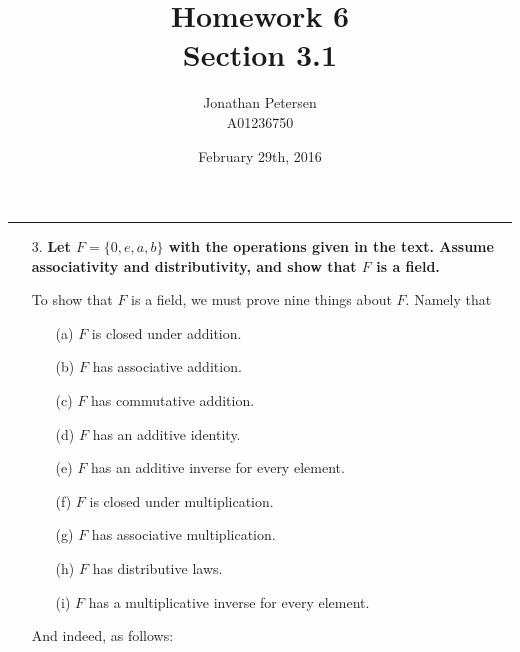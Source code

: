 \documentclass{article}
\title{Homework 6 \\ Section 3.1}
\author{Jonathan Petersen \\ A01236750}
\date{February 29th, 2016}
\begin{document}
	\maketitle
	\hrule 
	\vspace{5mm}
	\begin{enumerate}
		\item [3.] \textbf{Let $F = \lbrace 0, e, a, b \rbrace$ with the operations given in the 
					text. Assume associativity and distributivity, and show that $F$ is a field.}

			To show that $F$ is a field, we must prove nine things about $F$. Namely that
			\begin{enumerate}
				\item [(a)]$F$ is closed under addition.
				\item [(b)]$F$ has associative addition.
				\item [(c)]$F$ has commutative addition.
				\item [(d)]$F$ has an additive identity.
				\item [(e)]$F$ has an additive inverse for every element.
				\item [(f)]$F$ is closed under multiplication.
				\item [(g)]$F$ has associative multiplication.
				\item [(h)]$F$ has distributive laws.
				\item [(i)]$F$ has a multiplicative inverse for every element.
			\end{enumerate}

			And indeed, as follows:


\end{enumerate}
\end{document}
